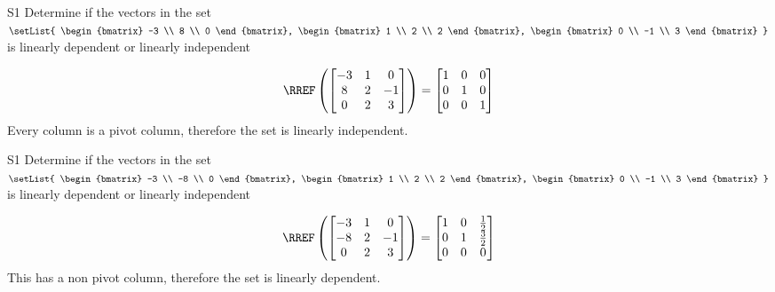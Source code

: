 \begin{problem}{S1}
Determine if the vectors in the set \(\setList{ \begin{bmatrix} -3 \\ 8 \\ 0 \end{bmatrix}, \begin{bmatrix} 1 \\ 2 \\ 2 \end{bmatrix}, \begin{bmatrix} 0 \\ -1 \\ 3 \end{bmatrix} }\) is  linearly dependent or linearly independent
\end{problem}
\begin{solution}
\[\RREF\left( \begin{bmatrix}-3 & 1 & 0 \\ 8 & 2 & -1 \\ 0 & 2 & 3 \end{bmatrix}\right) = \begin{bmatrix} 1 & 0 & 0 \\ 0 & 1 & 0 \\ 0 & 0 & 1 \end{bmatrix}\]
Every column is a pivot column, therefore the set is linearly independent.
\end{solution}

\begin{problem}{S1}
Determine if the vectors in the set \(\setList{ \begin{bmatrix} -3 \\ -8 \\ 0 \end{bmatrix}, \begin{bmatrix} 1 \\ 2 \\ 2 \end{bmatrix}, \begin{bmatrix} 0 \\ -1 \\ 3 \end{bmatrix} }\) is  linearly dependent or linearly independent
\end{problem}
\begin{solution}
\[\RREF\left( \begin{bmatrix}-3 & 1 & 0 \\ -8 & 2 & -1 \\ 0 & 2 & 3 \end{bmatrix}\right) = \begin{bmatrix} 1 & 0 & \frac{1}{2} \\ 0 & 1 & \frac{3}{2} \\ 0 & 0 & 0 \end{bmatrix}\]
This has a non pivot column, therefore the set is linearly dependent.
\end{solution}



